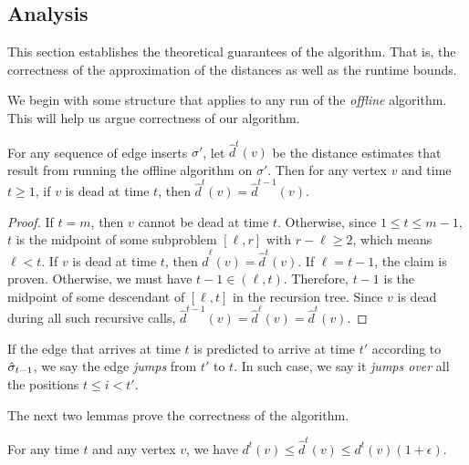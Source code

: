 \subsection{Analysis}

This section establishes the theoretical guarantees of the algorithm. That is, the correctness of the approximation of the distances as well as the runtime bounds. 

We begin with some structure that applies to any run of the \emph{offline} algorithm.  This will help us argue correctness of our algorithm.
\begin{lemma}
\label{lem:dead_estimates_dont_change}
    For any sequence of edge inserts $\sigma'$, let $\hat{d}^t(v)$ be the distance estimates that result from running the offline algorithm on $\sigma'$.  Then 
    for any vertex $v$ and time $t \geq 1$, 
    if $v$ is dead at time $t$, then $\hat{d}^t(v) = \hat{d}^{t-1}(v)$.
\end{lemma}
\begin{proof}
    If $t = m$, then $v$ cannot be dead at time $t$.
    Otherwise, since $1 \leq t \leq m-1$, $t$ is the midpoint of some subproblem $[\ell, r]$ with $r-\ell \geq 2$, which means $\ell < t$.  If $v$ is dead at time $t$, then $\hat{d}^\ell(v) = \hat{d}^t(v)$.  
    If $\ell = t-1$, the claim is proven.
    Otherwise, we must have $t-1 \in (\ell, t)$.  Therefore, $t-1$ is the midpoint of some descendant of $[\ell, t]$ in the recursion tree.  Since $v$ is dead during all such recursive calls, $\hat{d}^{t-1}(v) = \hat{d}^\ell(v) = \hat{d}^t(v)$.
  \end{proof}
   
If the edge that arrives at time $t$ is predicted to arrive at time $t'$ according to $\hat{\sigma}_{t-1}$, we say the edge \emph{jumps} from $t'$ to $t$. In such case, we say it \emph{jumps over} all the positions $t \leq i < t'$. 

The next two lemmas prove the correctness of the algorithm. 

\begin{lemma}\label{lem:pred_approx}
    For any time $t$ and any vertex $v$, we have $d^t(v) \leq \hat{d}^t(v) \leq d^t(v)(1+\epsilon)$.
\end{lemma}

